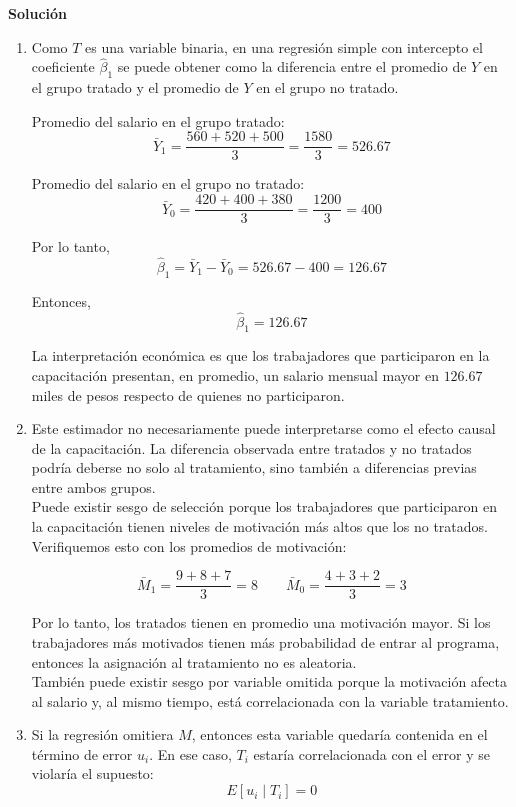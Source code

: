 \documentclass[10pt,a4paper]{article}
\begin{document}
\begin{enumerate}
    \textbf{Solución}

    \begin{enumerate}
        \item Como \(T\) es una variable binaria, en una regresión simple con intercepto el coeficiente \(\hat{\beta}_1\) se puede obtener como la diferencia entre el promedio de \(Y\) en el grupo tratado y el promedio de \(Y\) en el grupo no tratado.

        Promedio del salario en el grupo tratado:
        \[
        \bar{Y}_1=\frac{560+520+500}{3}=\frac{1580}{3}=526.67
        \]

        Promedio del salario en el grupo no tratado:
        \[
        \bar{Y}_0=\frac{420+400+380}{3}=\frac{1200}{3}=400
        \]

        Por lo tanto,
        \[
        \hat{\beta}_1=\bar{Y}_1-\bar{Y}_0=526.67-400=126.67
        \]

        Entonces,
        \[
        \boxed{\hat{\beta}_1=126.67}
        \]

      La interpretación económica es que los trabajadores que participaron en la capacitación presentan, en promedio, un salario mensual mayor en \(126.67\) miles de pesos respecto de quienes no participaron.

\item Este estimador no necesariamente puede interpretarse como el efecto causal de la capacitación. La diferencia observada entre tratados y no tratados podría deberse no solo al tratamiento, sino también a diferencias previas entre ambos grupos. \\ 
  Puede existir sesgo de selección porque los trabajadores que participaron en la capacitación tienen niveles de motivación más altos que los no tratados. Verifiquemos esto con los promedios de motivación:

        \[
        \bar{M}_1=\frac{9+8+7}{3}=8
        \qquad
        \bar{M}_0=\frac{4+3+2}{3}=3
        \]

        Por lo tanto, los tratados tienen en promedio una motivación mayor. Si los trabajadores más motivados tienen más probabilidad de entrar al programa, entonces la asignación al tratamiento no es aleatoria. \\ 
        También puede existir sesgo por variable omitida porque la motivación afecta al salario y, al mismo tiempo, está correlacionada con la variable tratamiento.

        \item  Si la regresión omitiera \(M\), entonces esta variable quedaría contenida en el término de error \(u_i\). En ese caso, \(T_i\) estaría correlacionada con el error y se violaría el supuesto:
        \[
        E[u_i \mid T_i]=0
        \]


\end{enumerate}
\end{enumerate}
\end{document}
